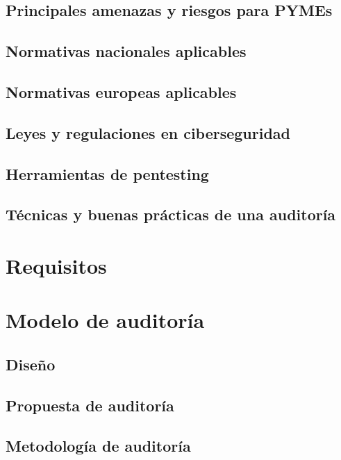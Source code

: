 \documentclass[a4paper, 10pt]{article}
\begin{document}
\subsection{Principales amenazas y riesgos para PYMEs}
\subsection{Normativas nacionales aplicables}
\subsection{Normativas europeas aplicables}
\subsection{Leyes y regulaciones en ciberseguridad}
\subsection{Herramientas de pentesting}
\subsection{Técnicas y buenas prácticas de una auditoría}

\clearpage

\section{Requisitos}

\clearpage

\section{Modelo de auditoría}

\subsection{Diseño}

\subsection{Propuesta de auditoría}

\subsection{Metodología de auditoría}
\end{document}
